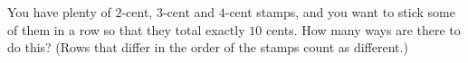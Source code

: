 You have plenty of $2$-cent, $3$-cent and $4$-cent stamps, and you want to stick some of them in a row so that they total exactly $10$ cents. How many ways are there to do this? (Rows that differ in the order of the stamps count as different.)
